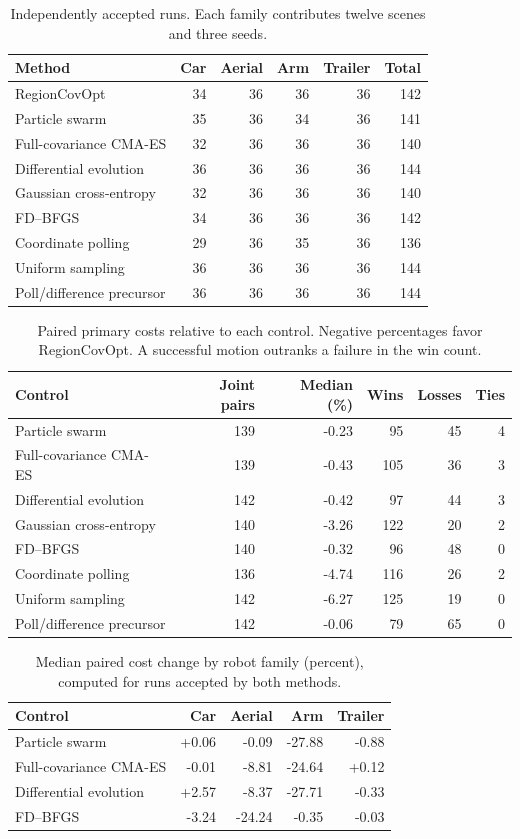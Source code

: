\begin{table}[htbp]\centering\small\caption{Independently accepted runs. Each family contributes twelve scenes and three seeds.}\begin{tabular}{lrrrrr}\toprule
Method & Car & Aerial & Arm & Trailer & Total\\\midrule
RegionCovOpt & 34 & 36 & 36 & 36 & 142\\
Particle swarm & 35 & 36 & 34 & 36 & 141\\
Full-covariance CMA-ES & 32 & 36 & 36 & 36 & 140\\
Differential evolution & 36 & 36 & 36 & 36 & 144\\
Gaussian cross-entropy & 32 & 36 & 36 & 36 & 140\\
FD--BFGS & 34 & 36 & 36 & 36 & 142\\
Coordinate polling & 29 & 36 & 35 & 36 & 136\\
Uniform sampling & 36 & 36 & 36 & 36 & 144\\
Poll/difference precursor & 36 & 36 & 36 & 36 & 144\\
\bottomrule\end{tabular}\end{table}
\begin{table}[htbp]\centering\small\caption{Paired primary costs relative to each control. Negative percentages favor RegionCovOpt. A successful motion outranks a failure in the win count.}\begin{tabular}{lrrrrr}\toprule
Control & Joint pairs & Median (\%) & Wins & Losses & Ties\\\midrule
Particle swarm & 139 & -0.23 & 95 & 45 & 4\\
Full-covariance CMA-ES & 139 & -0.43 & 105 & 36 & 3\\
Differential evolution & 142 & -0.42 & 97 & 44 & 3\\
Gaussian cross-entropy & 140 & -3.26 & 122 & 20 & 2\\
FD--BFGS & 140 & -0.32 & 96 & 48 & 0\\
Coordinate polling & 136 & -4.74 & 116 & 26 & 2\\
Uniform sampling & 142 & -6.27 & 125 & 19 & 0\\
Poll/difference precursor & 142 & -0.06 & 79 & 65 & 0\\
\bottomrule\end{tabular}\end{table}
\begin{table}[htbp]\centering\small\caption{Median paired cost change by robot family (percent), computed for runs accepted by both methods.}\begin{tabular}{lrrrr}\toprule
Control & Car & Aerial & Arm & Trailer\\\midrule
Particle swarm & +0.06 & -0.09 & -27.88 & -0.88\\
Full-covariance CMA-ES & -0.01 & -8.81 & -24.64 & +0.12\\
Differential evolution & +2.57 & -8.37 & -27.71 & -0.33\\
FD--BFGS & -3.24 & -24.24 & -0.35 & -0.03\\
\bottomrule\end{tabular}\end{table}
